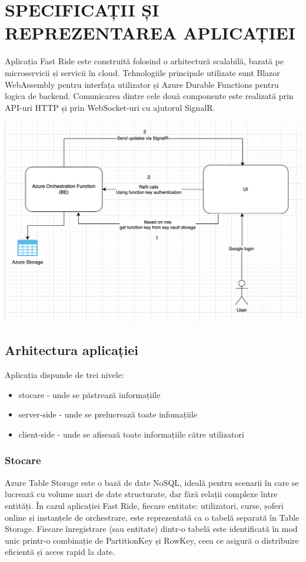\chapter{SPECIFICAȚII ȘI REPREZENTAREA APLICAȚIEI}
Aplicația Fast Ride este construită folosind o arhitectură scalabilă, bazată pe microservicii și servicii în cloud. Tehnologiile principale utilizate sunt Blazor WebAssembly pentru interfața utilizator și Azure Durable Functions pentru logica de backend. Comunicarea dintre cele două componente este realizată prin API-uri HTTP și prin WebSocket-uri cu ajutorul SignalR.

\includegraphics[width=14cm]{Assets/componentsComunication.png}
\section{Arhitectura aplicației}
Aplicația dispunde de trei nivele:
\begin{itemize}
    \item stocare - unde se păstrează informațiile
    \item server-side - unde se prelucrează toate infomațiile
    \item client-side - unde se afisează toate informațiile către utilizatori
\end{itemize}

\subsection{Stocare}

Azure Table Storage este o bază de date NoSQL, ideală pentru scenarii în care se lucrează cu volume mari de date structurate,
dar fără relații complexe între entități. În cazul aplicației Fast Ride, fiecare entitate: utilizatori, curse, șoferi online și instanțele de orchestrare, este reprezentată ca o tabelă separată în Table Storage. Fiecare înregistrare (sau entitate) dintr-o tabelă este identificată în mod unic printr-o combinație de PartitionKey și RowKey, ceea ce asigură o distribuire eficientă și acces rapid la date.

